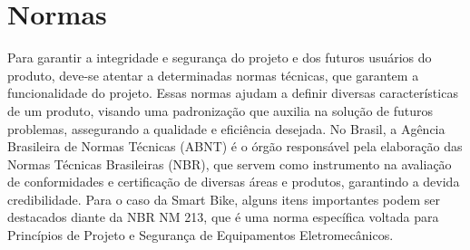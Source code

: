 \clearpage


  \section{Normas}
  Para garantir a integridade e segurança do projeto e dos futuros usuários do produto, deve-se atentar a determinadas normas técnicas, que garantem a funcionalidade do projeto. Essas normas ajudam a definir diversas características de um produto, visando uma padronização que auxilia na solução de futuros problemas, assegurando a qualidade e eficiência desejada. No Brasil, a Agência Brasileira de Normas Técnicas (ABNT) é o órgão responsável pela elaboração das Normas Técnicas Brasileiras (NBR), que servem como instrumento na avaliação de conformidades e certificação de diversas áreas e produtos, garantindo a devida credibilidade. Para o caso da Smart Bike, alguns itens importantes podem ser destacados diante da NBR NM 213, que é uma norma específica voltada para Princípios de Projeto e Segurança de Equipamentos Eletromecânicos.
  

